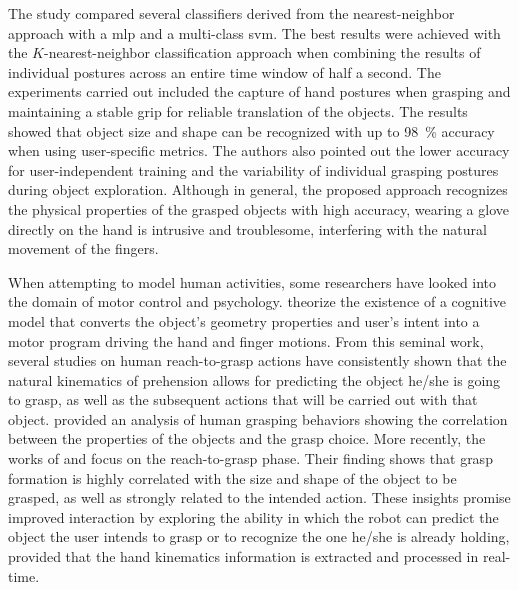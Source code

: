 The study compared several classifiers derived from the nearest-neighbor approach with a \acf{mlp} and a multi-class \acs{svm}. The best results were achieved with the $K$-nearest-neighbor classification approach when combining the results of individual postures across an entire time window of half a second. The experiments carried out included the capture of hand postures when grasping and maintaining a stable grip for reliable translation of the objects. The results showed that object size and shape can be recognized with up to \SI{98}{\percent} accuracy when using user-specific metrics. The authors also pointed out the lower accuracy for user-independent training and the variability of individual grasping postures during object exploration. Although in general, the proposed approach recognizes the physical properties of the grasped objects with high accuracy, wearing a glove directly on the hand is intrusive and troublesome, interfering with the natural movement of the fingers.

When attempting to model human activities, some researchers have looked into the domain of motor control and psychology. \textcite{Mackenzie1994} theorize the existence of a cognitive model that converts the object’s geometry properties and user’s intent into a motor program driving the hand and finger motions. From this seminal work, several studies on human reach-to-grasp actions have consistently shown that the natural kinematics of prehension allows for predicting the object he/she is going to grasp, as well as the subsequent actions that will be carried out with that object. \textcite{Feix2014} provided an analysis of human grasping behaviors showing the correlation between the properties of the objects and the grasp choice. More recently, the works of \textcite{Betti2018} and \textcite{Egmose2018} focus on the reach-to-grasp phase. Their finding shows that grasp formation is highly correlated with the size and shape of the object to be grasped, as well as strongly related to the intended action. These insights promise improved interaction by exploring the ability in which the robot can predict the object the user intends to grasp or to recognize the one he/she is already holding, provided that the hand kinematics information is extracted and processed in real-time.

